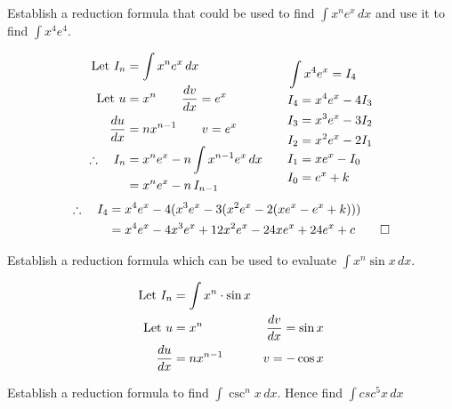 \documentclass{standalone}
\begin{document}
	
	\begin{example}
		Establish a reduction formula that could be used to find $\int x^ne^x \, dx$ and use it to find $\int x^4e^4$.
	\end{example}
	
	\begin{equation*}
		\begin{split}
			\text{Let } I_n &= \int x^ne^x \, dx \\
			\text{Let } u 	&= x^n    \qquad   \frac{dv}{dx} = e^x \\
			\frac{du}{dx}     	&= nx^{n-1} \qquad  v = e^x         \\
			\therefore \quad I_n	&= x^ne^x - n \int x^{n-1}e^x \, dx\qquad\\
			&= x^ne^x - n\, I_{n-1}
		\end{split}
		\begin{split}
			&\int x^4e^x = I_4\\
			&I_4 = x^4e^x - 4I_3\\
			&I_3 = x^3e^x - 3I_2\\
			&I_2 = x^2e^x - 2I_1\\		
			&I_1 = xe^x - I_0\\				 		 	
			&I_0 = e^x + k
		\end{split}
	\end{equation*}
	\begin{align*}
		\therefore \quad I_4 & = x^4e^x -4(x^3e^x - 3(x^2e^x - 2(xe^x - e^x + k))) \\
		& = x^4e^x -4x^3e^x + 12x^2e^x - 24xe^x + 24e^x + c   \qed
	\end{align*}
	
	\begin{example}
		Establish a reduction formula which can be used to evaluate $\int x^n \sin x \, dx$.
	\end{example}
	
	\begin{align*}
		\text{Let } I_n &= \int x^n \cdot \sin x\\
		\text{Let } u & = x^n      & \frac{dv}{dx} = \sin x \\
		\frac{du}{dx}     & = nx^{n-1} & v= -\cos x         
	\end{align*}
	\hrulefill\newpage
	\begin{example}
		Establish a reduction formula to find $\int \csc^nx \, dx$. Hence find $\int csc^5x \, dx$
	\end{example}
\end{document}
